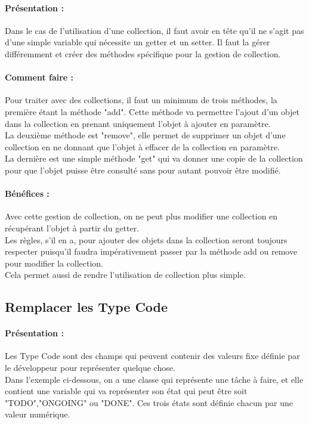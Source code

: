 \documentclass[a4paper,twoside,12pt,openright]{report}
\begin{document}
\paragraph{Présentation :}
Dans le cas de l'utilisation d'une collection, il faut avoir en tête qu'il ne s'agit pas d'une simple variable qui nécessite un getter et un setter. Il faut la gérer différemment et créer des méthodes spécifique pour la gestion de collection.

\paragraph{Comment faire :}
Pour traiter avec des collections, il faut un minimum de trois méthodes, la première étant la méthode "add". Cette méthode va permettre l'ajout d'un objet dans la collection en prenant uniquement l'objet à ajouter en paramètre.\\
La deuxième méthode est "remove", elle permet de supprimer un objet d'une collection en ne donnant que l'objet à effacer de la collection en paramètre.\\
La dernière est une simple méthode "get" qui va donner une copie de la collection pour que l'objet puisse être consulté sans pour autant pouvoir être modifié.

\paragraph{Bénéfices :}
Avec cette gestion de collection, on ne peut plus modifier une collection en récupérant l'objet à partir du getter.\\
Les règles, s'il en a, pour ajouter des objets dans la collection seront toujours respecter puisqu'il faudra impérativement passer par la méthode add ou remove pour modifier la collection.\\
Cela permet aussi de rendre l'utilisation de collection plus simple.

\subsection{Remplacer les Type Code}
\paragraph{Présentation :}
Les Type Code sont des champs qui peuvent contenir des valeurs fixe définie par le développeur pour représenter quelque chose.\\
Dans l'exemple ci-dessous, on a une classe qui représente une tâche à faire, et elle contient une variable qui va représenter son état qui peut être soit "TODO","ONGOING" ou "DONE". Ces trois états sont définie chacun par une valeur numérique.
\end{document}
